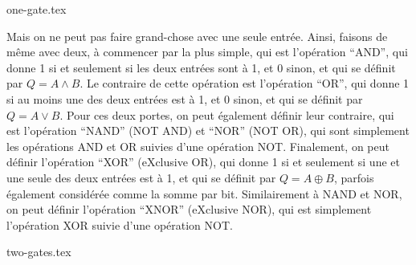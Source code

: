 {one-gate.tex}

Mais on ne peut pas faire grand-chose avec une seule entrée.
Ainsi, faisons de même avec deux, à commencer par la plus simple, qui est l'opération ``AND'', qui donne 1 si
et seulement si les deux entrées sont à 1, et 0 sinon, et qui se définit par $Q = A \land B$.
Le contraire de cette opération est l'opération ``OR'', qui donne 1 si au moins une des deux entrées est à 1,
et 0 sinon, et qui se définit par $Q = A \lor B$.
Pour ces deux portes, on peut également définir leur contraire, qui est l'opération ``NAND'' (NOT AND) et
``NOR'' (NOT OR), qui sont simplement les opérations AND et OR suivies d'une opération NOT\@.
Finalement, on peut définir l'opération ``XOR'' (eXclusive OR), qui donne 1 si et seulement si une et une seule
des deux entrées est à 1, et qui se définit par $Q = A \oplus B$, parfois également considérée comme la somme
par bit.
Similairement à NAND et NOR, on peut définir l'opération ``XNOR'' (eXclusive NOR), qui est simplement l'opération
XOR suivie d'une opération NOT\@.

{two-gates.tex}

